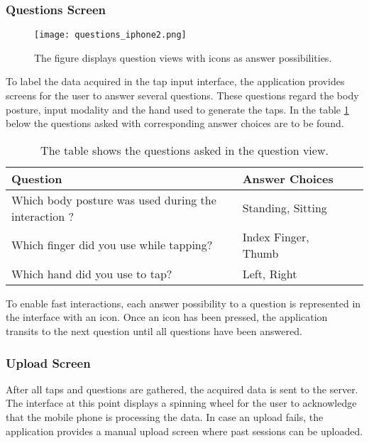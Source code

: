 \subsubsection{Questions Screen}
\begin{figure}[h!]
  \centering
  \texttt{[image: questions\_iphone2.png]}
  \caption{The figure displays question views with icons as answer possibilities.}
\end{figure}

To label the data acquired in the tap input interface, the application provides screens for the user to answer several questions. These questions regard the body posture, input modality and the hand used to generate the taps. In the table \ref{table:questions} below the questions asked with corresponding answer choices are to be found.


\begin{table}
  \centering
  \begin{tabular}{| l | l | l | l |}
  \hline
  \textbf{Question} & \textbf{Answer Choices} \\ \hline
  Which body posture was used during the interaction ? & Standing, Sitting \\
  Which finger did you use while tapping? & Index Finger, Thumb \\
  Which hand did you use to tap? & Left, Right \\
  \hline
  \end{tabular}
  \caption{The table shows the questions asked in the question view.}\label{table:questions}
\end{table}

To enable fast interactions, each answer possibility to a question is represented in the interface with an icon. Once an icon has been pressed, the application transits to the next question until all questions have been answered.

\subsubsection{Upload Screen}
After all taps and questions are gathered, the acquired data is sent to the server. The interface at this point displays a spinning wheel for the user to acknowledge that the mobile phone is processing the data. In case an upload fails, the application provides a manual upload screen where past sessions can be uploaded.

